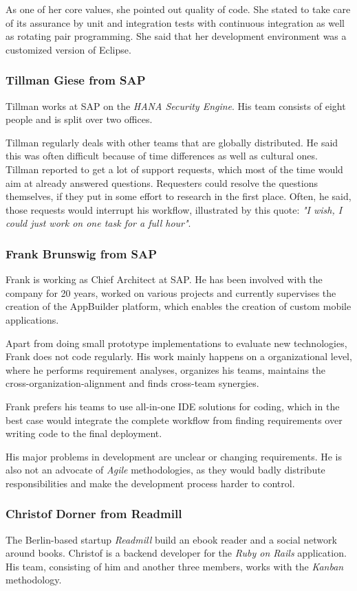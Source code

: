 As one of her core values, she pointed out quality of code. She stated to take care of its assurance by unit and integration tests with continuous integration as well as rotating pair programming. She said that her development environment was a customized version of Eclipse.

\subsubsection{Tillman Giese from SAP}
Tillman works at SAP on the \emph{HANA Security Engine}. His team consists of eight people and is split over two offices.

Tillman regularly deals with other teams that are globally distributed. He said this was often difficult because of time differences as well as cultural ones. Tillman reported to get a lot of support requests, which most of the time would aim at already answered questions. Requesters could resolve the questions themselves, if they put in some effort to research in the first place. Often, he said, those requests would interrupt his workflow, illustrated by this quote: \emph{"I wish, I could just work on one task for a full hour"}.

\subsubsection{Frank Brunswig from SAP}
Frank is working as Chief Architect at SAP. He has been involved with the company for 20 years, worked on various projects and currently supervises the creation of the AppBuilder platform, which enables the creation of custom mobile applications.

Apart from doing small prototype implementations to evaluate new technologies, Frank does not code regularly. His work mainly happens on a organizational level, where he performs requirement analyses, organizes his teams, maintains the cross-organization-alignment and finds cross-team synergies.

Frank prefers his teams to use all-in-one IDE solutions for coding, which in the best case would integrate the complete workflow from finding requirements over writing code to the final deployment.

His major problems in development are unclear or changing requirements. He is also not an advocate of \emph{Agile} methodologies, as they would badly distribute responsibilities and make the development process harder to control.

\subsubsection{Christof Dorner from Readmill}
The Berlin-based startup \emph{Readmill} build an ebook reader and a social network around books. Christof is a backend developer for the \emph{Ruby on Rails} application. His team, consisting of him and another three members,  works with the \emph{Kanban} methodology.

